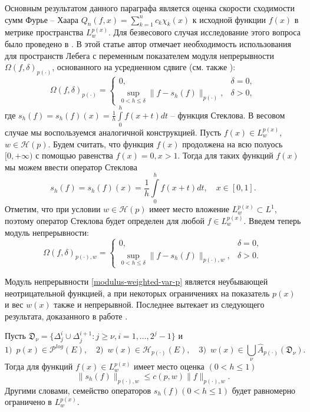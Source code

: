Основным результатом данного параграфа является оценка скорости сходимости сумм Фурье -- Хаара
$Q_n(f,x)=\sum\limits_{k=1}^n c_k \chi_k(x)$
к исходной функции $f(x)$ в метрике пространства $L^{p(x)}_w$. Для безвесового случая исследование этого вопроса было проведено в \cite{shii-haarspeed}. В этой статье автор отмечает необходимость использования для пространств Лебега с переменным показателем модуля непрерывности $\Omega(f,\delta)_{p(\cdot)}$, основанного на усредненном сдвиге (см. также \cite{guven-trigapp}):
\begin{equation}\label{modulus-var-p}
\Omega(f,\delta)_{p(\cdot)}=
\begin{cases}
0, &\delta=0,\\
\sup\limits_{0 < h\le\delta}\|f-s_h(f)\|_{p(\cdot)}, &\delta>0,
\end{cases}
\end{equation}
где $s_h(f)=s_h(f)(x)=\frac{1}{h}\int\limits_0^hf(x+t)dt$ -- функция Стеклова. В весовом случае мы воспользуемся аналогичной конструкцией. Пусть $f(x) \in L^{p(x)}_w$, $w \in \mathcal{H}(p)$. Будем считать, что функция $f(x)$ продолжена на всю полуось $[0,+\infty)$ с помощью равенства $f(x)=0, x>1$. Тогда для таких функций $f(x)$ мы можем ввести оператор Стеклова
\begin{equation*}
  s_h(f)=s_h(f)(x)=\frac{1}{h}\int\limits_0^hf(x+t)dt, \quad x \in [0,1].
\end{equation*}
Отметим, что при условии $w \in \mathcal{H}(p)$ имеет место вложение $L^{p(x)}_w \subset L^1$, поэтому оператор Стеклова будет определен для любой $f \in L^{p(x)}_w$. Введем теперь модуль непрерывности:
\begin{equation}\label{modulus-weighted-var-p}
\Omega(f,\delta)_{p(\cdot),w}=
\begin{cases}
0, &\delta=0,\\
\sup\limits_{0 < h\le\delta}\|f-s_h(f)\|_{p(\cdot),w}, &\delta>0.
\end{cases}
\end{equation}

Модуль непрерывности \eqref{modulus-weighted-var-p} является неубывающей неотрицательной функцией, а при некоторых ограничениях на показатель $p(x)$ и вес $w(x)$ также и непрерывной. Последнее вытекает из следующего результата, доказанного в работе \cite{shakh-conv}.

\begin{theoremA}\label{sh-uniform-boundedness}
Пусть $\mathfrak{D}_\nu = \{\Delta_j^i \cup \Delta_j^{i+1} : j \ge \nu, i=1,\ldots,2^j-1\}$ и
\begin{equation*}
1)\,\,\, p(x) \in \mathcal{P}^{log}(E), \quad
2)\,\,\, w(x) \in \mathcal{H}_{p(\cdot)}(E), \quad
3)\,\,\, w(x) \in \bigcup\limits_\nu \hat{A}_{p(\cdot)}(\mathfrak{D}_\nu).
\end{equation*}
Тогда для функций $f(x) \in L^{p(x)}_w$ имеет место оценка $(0 < h \le 1)$
$$
    \|s_h(f)\|_{p(\cdot),w} \le c(p,w)\|f\|_{p(\cdot),w}.
$$
Другими словами, семейство операторов $s_h(f) (0<h \le 1)$ будет равномерно ограничено в $L^{p(x)}_w$.
\end{theoremA}

